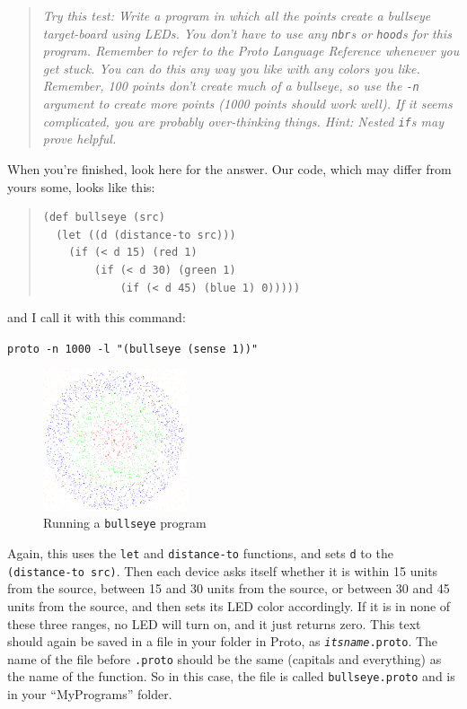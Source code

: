 \documentclass{article}
\newcommand\code[1]{\begin{center}\var{#1}\end{center}}
\newcommand\problem[1]{\begin{quote}{\em #1}\end{quote}}
\newcommand\var[1]{{\tt #1}}
\begin{document}
\problem{Try this test: Write a program in which all the points create
  a bullseye target-board using LEDs.  You don't have to use any
  \var{nbr}s or \var{hood}s for this program.  Remember to refer to
  the Proto Language Reference whenever you get stuck.  You can do
  this any way you like with any colors you like.  Remember, 100
  points don't create much of a bullseye, so use the \var{-n} argument
  to create more points (1000 points should work well).  If it seems
  complicated, you are probably over-thinking things.  Hint: Nested
  \var{if}s may prove helpful.}

When you're finished, look here for the answer.  Our code, which may
differ from yours some, looks like this:

\begin{quote}
\begin{verbatim}
(def bullseye (src)
  (let ((d (distance-to src)))
    (if (< d 15) (red 1)
        (if (< d 30) (green 1)
            (if (< d 45) (blue 1) 0)))))
\end{verbatim}
\end{quote}

and I call it with this command:

\code{proto -n 1000 -l "(bullseye (sense 1))"}

\begin{figure}
  \includegraphics[width=0.38\textwidth]{figures/bullseye.png}
  \caption{Running a \var{bullseye} program}
  \label{f:bullseye}
\end{figure}

Again, this uses the \var{let} and \var{distance-to} functions, and
sets \var{d} to the \var{(distance-to src)}.  Then each device asks
itself whether it is within 15 units from the source, between 15 and
30 units from the source, or between 30 and 45 units from the source,
and then sets its LED color accordingly.  If it is in none of these
three ranges, no LED will turn on, and it just returns zero.  This
text should again be saved in a file in your folder in Proto, as
\var{{\em itsname}.proto}.  The name of the file before \var{.proto}
should be the same (capitals and everything) as the name of the
function.  So in this case, the file is called \var{bullseye.proto}
and is in your ``MyPrograms'' folder.
\end{document}
